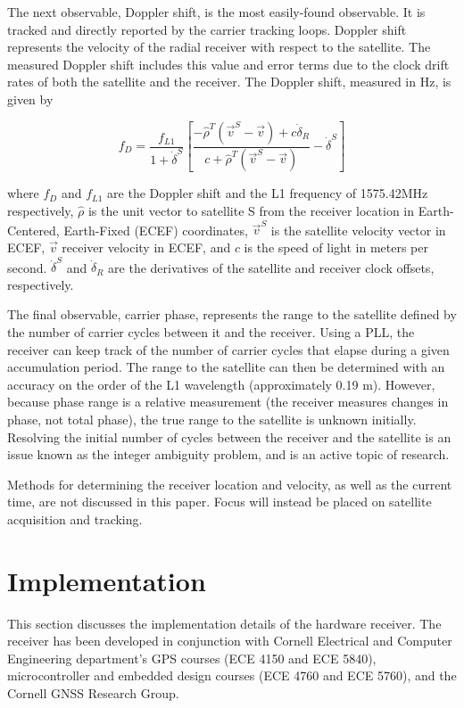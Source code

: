 \documentclass[12pt]{article}
\begin{document}
The next observable, Doppler shift, is the most easily-found observable. It is tracked and directly reported by the carrier tracking loops. Doppler shift represents the velocity of the radial receiver with respect to the satellite. The measured Doppler shift includes this value and error terms due to the clock drift rates of both the satellite and the receiver. The Doppler shift, measured in Hz, is given by

\begin{equation}
\label{eqn:doppler}
f_D=\frac{f_{L1}}{1+\dot{\delta}^S}\left[\frac{-\hat{\rho}^T(\vec{v}^S-\vec{v})+c\dot{\delta}_R}{c+\hat{\rho}^T(\vec{v}^S-\vec{v})} - \dot{\delta}^S\right]
\end{equation}

where $f_D$ and $f_{L1}$ are the Doppler shift and the L1 frequency of 1575.42MHz respectively, $\hat{\rho}$ is the unit vector to satellite S from the receiver location in Earth-Centered, Earth-Fixed (ECEF) coordinates, $\vec{v}^S$ is the satellite velocity vector in ECEF, $\vec{v}$ receiver velocity in ECEF, and $c$ is the speed of light in meters per second. $\dot{\delta}^S$ and $\dot{\delta}_R$ are the derivatives of the satellite and receiver clock offsets, respectively.

The final observable, carrier phase, represents the range to the satellite defined by the number of carrier cycles between it and the receiver. Using a PLL, the receiver can keep track of the number of carrier cycles that elapse during a given accumulation period. The range to the satellite can then be determined with an accuracy on the order of the L1 wavelength (approximately 0.19 m). However, because phase range is a relative measurement (the receiver measures changes in phase, not total phase), the true range to the satellite is unknown initially. Resolving the initial number of cycles between the receiver and the satellite is an issue known as the integer ambiguity problem, and is an active topic of research.

Methods for determining the receiver location and velocity, as well as the current time, are not discussed in this paper. Focus will instead be placed on satellite acquisition and tracking.

\section{Implementation}
This section discusses the implementation details of the hardware receiver. The receiver has been developed in conjunction with Cornell Electrical and Computer Engineering department's GPS courses (ECE 4150 and ECE 5840), microcontroller and embedded design courses (ECE 4760 and ECE 5760), and the Cornell GNSS Research Group.
\end{document}
